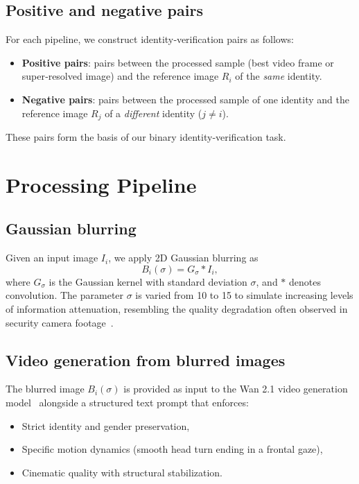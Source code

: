 \documentclass{ieeeaccess}
\begin{document}
\subsection{Positive and negative pairs}
For each pipeline, we construct identity‑verification pairs as follows:

\begin{itemize}
    \item \textbf{Positive pairs}: pairs between the processed sample (best video frame or super‑resolved image) and the reference image $R_i$ of the \emph{same} identity.
    \item \textbf{Negative pairs}: pairs between the processed sample of one identity and the reference image $R_j$ of a \emph{different} identity ($j \neq i$).
\end{itemize}

These pairs form the basis of our binary identity‑verification task.

\section{Processing Pipeline}
\label{sec:pipeline}

\subsection{Gaussian blurring}
Given an input image $I_i$, we apply 2D Gaussian blurring as
\begin{equation}
    B_i(\sigma) = G_\sigma * I_i,
\end{equation}
where $G_\sigma$ is the Gaussian kernel with standard deviation $\sigma$, and $*$ denotes convolution. The parameter $\sigma$ is varied from 10 to 15 to simulate increasing levels of information attenuation, resembling the quality degradation often observed in security camera footage~\cite{SurveyDiffusionISR}.

\subsection{Video generation from blurred images}
The blurred image $B_i(\sigma)$ is provided as input to the Wan 2.1 video generation model~\cite{Wan2_1} alongside a structured text prompt that enforces:

\begin{itemize}
    \item Strict identity and gender preservation,
    \item Specific motion dynamics (smooth head turn ending in a frontal gaze),
    \item Cinematic quality with structural stabilization.
\end{itemize}
\end{document}
